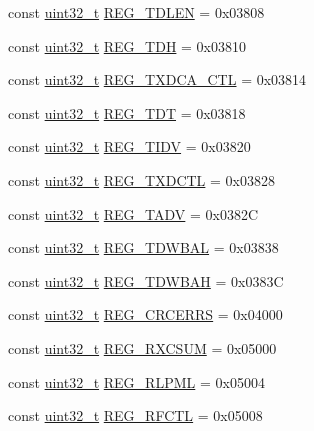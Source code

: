 \begin{DoxyCompactItemize}
\item 
const \hyperlink{Type_8hh_a435d1572bf3f880d55459d9805097f62}{uint32\_\-t} \hyperlink{namespaceiGbReg_ae885006ab462d77f5678312d6181c978}{REG\_\-TDLEN} = 0x03808
\item 
const \hyperlink{Type_8hh_a435d1572bf3f880d55459d9805097f62}{uint32\_\-t} \hyperlink{namespaceiGbReg_aff7b48a39ed90fc8943a7b7042c9e996}{REG\_\-TDH} = 0x03810
\item 
const \hyperlink{Type_8hh_a435d1572bf3f880d55459d9805097f62}{uint32\_\-t} \hyperlink{namespaceiGbReg_adcec938fa39b4e7ff85d6b1622ccd3a5}{REG\_\-TXDCA\_\-CTL} = 0x03814
\item 
const \hyperlink{Type_8hh_a435d1572bf3f880d55459d9805097f62}{uint32\_\-t} \hyperlink{namespaceiGbReg_ac15be2850d41581ca8530f32a90e5b0f}{REG\_\-TDT} = 0x03818
\item 
const \hyperlink{Type_8hh_a435d1572bf3f880d55459d9805097f62}{uint32\_\-t} \hyperlink{namespaceiGbReg_a871dec634edf3b35037939946579d39b}{REG\_\-TIDV} = 0x03820
\item 
const \hyperlink{Type_8hh_a435d1572bf3f880d55459d9805097f62}{uint32\_\-t} \hyperlink{namespaceiGbReg_a236e025cbd514be3c492cb45614ba3ae}{REG\_\-TXDCTL} = 0x03828
\item 
const \hyperlink{Type_8hh_a435d1572bf3f880d55459d9805097f62}{uint32\_\-t} \hyperlink{namespaceiGbReg_abebfa86c43f0b0a894e7bedc2f329b59}{REG\_\-TADV} = 0x0382C
\item 
const \hyperlink{Type_8hh_a435d1572bf3f880d55459d9805097f62}{uint32\_\-t} \hyperlink{namespaceiGbReg_ab8f86fd995c08da473a1d40511517901}{REG\_\-TDWBAL} = 0x03838
\item 
const \hyperlink{Type_8hh_a435d1572bf3f880d55459d9805097f62}{uint32\_\-t} \hyperlink{namespaceiGbReg_a050b53dacdbc8075f739b04caf5bfd6c}{REG\_\-TDWBAH} = 0x0383C
\item 
const \hyperlink{Type_8hh_a435d1572bf3f880d55459d9805097f62}{uint32\_\-t} \hyperlink{namespaceiGbReg_a0ac38603fe50560ca10542b091cce4e3}{REG\_\-CRCERRS} = 0x04000
\item 
const \hyperlink{Type_8hh_a435d1572bf3f880d55459d9805097f62}{uint32\_\-t} \hyperlink{namespaceiGbReg_ac4ca58b53d0899d9e2cb3b6a01172029}{REG\_\-RXCSUM} = 0x05000
\item 
const \hyperlink{Type_8hh_a435d1572bf3f880d55459d9805097f62}{uint32\_\-t} \hyperlink{namespaceiGbReg_ac694a64b5dc3ed66f0a198e11c6dd561}{REG\_\-RLPML} = 0x05004
\item 
const \hyperlink{Type_8hh_a435d1572bf3f880d55459d9805097f62}{uint32\_\-t} \hyperlink{namespaceiGbReg_a55fd6fefe9e6e544fbf5dd7d80dd6c42}{REG\_\-RFCTL} = 0x05008

\end{DoxyCompactItemize}
